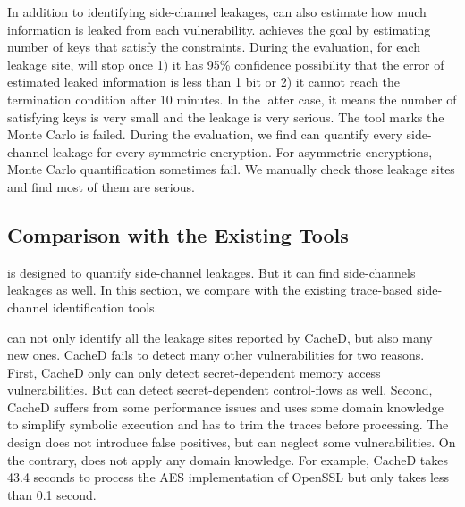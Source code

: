 In addition to identifying side-channel leakages, \tool{} can also estimate how
much information is leaked from each vulnerability. \tool{} achieves 
the goal by estimating number of keys that satisfy the constraints.
During the evaluation, for each leakage site, 
\tool{} will stop once 1) it has 95\% confidence 
possibility that the error of estimated leaked information is less than
1 bit or 2) it cannot reach the termination condition after 10 minutes. In 
the latter case, it means the number of satisfying keys is very small and the leakage is 
very serious. The tool marks the Monte Carlo is failed. During the 
evaluation, we find \tool{} can quantify every side-channel leakage 
for every symmetric encryption. For asymmetric encryptions, Monte 
Carlo quantification sometimes fail. We manually check those leakage 
sites and find most of them are serious. 

\subsection{Comparison with the Existing Tools}
\tool{} is designed to quantify side-channel leakages. But it can
find side-channels leakages as well. In this section, we compare 
\tool{} with the existing trace-based side-channel identification 
tools.

\tool{} can not only identify all the leakage sites reported by CacheD,
but also many new ones.
CacheD fails to detect many other vulnerabilities for two
reasons. First, CacheD only can only detect secret-dependent
memory access vulnerabilities. But \tool{} can detect 
secret-dependent control-flows as well. Second, CacheD suffers
from some performance issues and uses some domain knowledge 
to simplify symbolic execution and has to trim the traces before processing. The design does 
not introduce false positives, but can neglect some vulnerabilities. 
 On the contrary, \tool{} does not apply any domain knowledge. 
For example, CacheD takes 43.4 seconds to process the AES implementation
of OpenSSL but \tool{} only takes less than 0.1 second.

